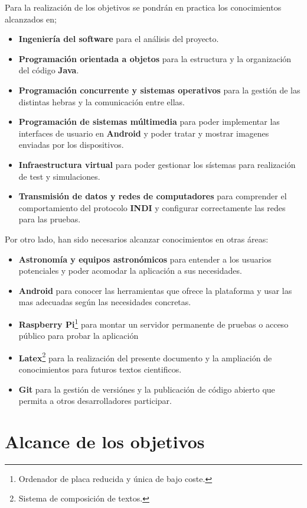 \bigskip
Para la realización de los objetivos se pondrán en practica los conocimientos alcanzados en;

\begin{itemize}
  \item \textbf{Ingeniería del software} para el análisis del proyecto.
  \item \textbf{Programación orientada a objetos} para la estructura y la organización del código \textbf{Java}.
  \item \textbf{Programación concurrente y sistemas operativos} para la gestión de las distintas hebras y la comunicación entre ellas.
  \item \textbf{Programación de sistemas múltimedia} para poder implementar las interfaces de usuario en \textbf{Android} y poder tratar y mostrar imagenes enviadas por los dispositivos.
  \item \textbf{Infraestructura virtual} para poder gestionar los sístemas para realización de test y simulaciones.
  \item \textbf{Transmisión de datos y redes de computadores} para comprender el comportamiento del protocolo \textbf{INDI} y configurar correctamente las redes para las pruebas.
\end{itemize}

\bigskip
Por otro lado, han sido necesarios alcanzar conocimientos en otras áreas:

\begin{itemize}
  \item \textbf{Astronomía y equipos astronómicos} para entender a los usuarios potenciales y poder acomodar la aplicación a sus necesidades.
  \item \textbf{Android} para conocer las herramientas que ofrece la plataforma y usar las mas adecuadas según las necesidades concretas.
  \item \textbf{Raspberry Pi}\footnote{Ordenador de placa reducida y única de bajo coste.} para montar un servidor permanente de pruebas o acceso público para probar la aplicación
  \item \textbf{Latex}\footnote{Sistema de composición de textos.} para la realización del presente documento y la ampliación de conocimientos para futuros textos cientificos.
  \item \textbf{Git} para la gestión de versiónes y la publicación de código abierto que permita a otros desarrolladores participar.
\end{itemize}


\section{Alcance de los objetivos}

